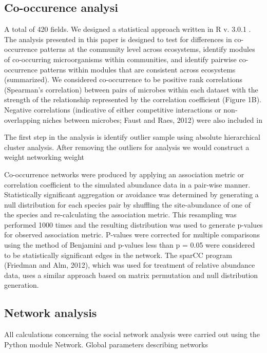 \documentclass[a4paper]{article}
\begin{document}
\subsection*{Co-occurence analysi}

A total of 420 fields. We designed a statistical approach written in R v. 3.0.1 . The analysis presented in this paper is designed to test for differences in co-occurrence patterns at the community level across ecosystems, identify modules of co-occurring microorganisms within communities, and identify pairwise co-occurrence patterns within modules that are consistent across ecosystems (summarized). We considered co-occurrence to be positive rank correlations (Spearman's correlation) between pairs of microbes within each dataset with the strength of the relationship represented by the correlation coefficient (Figure 1B). Negative correlations (indicative of either competitive interactions or non-overlapping niches between microbes; Faust and Raes, 2012) were also included in

The first step in the analysis  is identify outlier sample using absolute hierarchical cluster analysis. After removing the outliers for analysis we would construct a weight networking  weight

Co-occurrence networks were produced by applying an association metric or correlation coefficient to the simulated abundance data in a pair-wise manner. Statistically significant aggregation or avoidance was determined by generating a null distribution for each species pair by shuffling the site-abundance of one of the species and re-calculating the association metric. This resampling was performed 1000 times and the resulting distribution was used to generate p-values for observed association metric. P-values were corrected for multiple comparisons using the method of Benjamini and p-values less than p = 0.05 were considered to be statistically significant edges in the network. The sparCC program (Friedman and Alm, 2012), which was used for treatment of relative abundance data, uses a similar approach based on matrix permutation and null distribution generation.


\subsection*{Network analysis}

All calculations concerning the social network analysis were carried out using the Python module Network.
Global parameters describing networks
\end{document}
